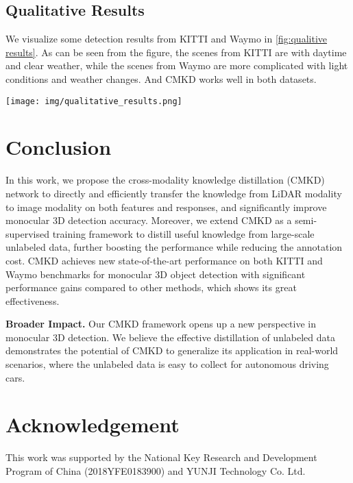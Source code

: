 \documentclass[runningheads]{llncs}
\begin{document}
\subsection{Qualitative Results}

We visualize some detection results from KITTI and Waymo in \cref{fig:qualitive results}.
As can be seen from the figure, the scenes from KITTI are with daytime and clear weather, while the scenes from Waymo are more complicated with light conditions and weather changes.
And CMKD works well in both datasets.

\begin{figure*}[t]
  \centering
  \texttt{[image: img/qualitative\_results.png]}
  \caption{Qualitative results on KITTI $test$ (top line) and Waymo $val$ (bottom line). None of the samples were seen during training.}
  \label{fig:qualitive results}
\end{figure*}

\newpage
\section{Conclusion}
In this work, we propose the cross-modality knowledge distillation (CMKD) network to directly and efficiently transfer the knowledge from LiDAR modality to image modality on both features and responses, and significantly improve monocular 3D detection accuracy.
Moreover, we extend CMKD as a semi-supervised training framework to distill useful knowledge from large-scale unlabeled data, further boosting the performance while reducing the annotation cost.
CMKD achieves new state-of-the-art performance on both KITTI and Waymo benchmarks for monocular 3D object detection with significant performance gains compared to other methods, which shows its great effectiveness.

\noindent\textbf{Broader Impact.} 
Our CMKD framework opens up a new perspective in monocular 3D detection.
We believe the effective distillation of unlabeled data demonstrates the potential of CMKD to generalize its application in real-world scenarios, where the unlabeled data is easy to collect for autonomous driving cars.

\section*{Acknowledgement}
This work was supported by the National Key Research and Development Program of China (2018YFE0183900) and YUNJI Technology Co. Ltd.





\end{document}
